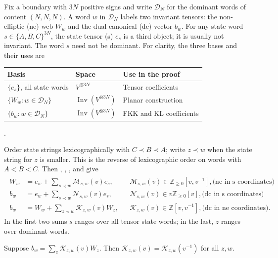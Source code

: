 \documentclass[a4paper,11pt]{amsart}
\newcommand{\Z}{\mathbb Z}
\newcommand{\Inv}{\operatorname{Inv}}
\newcommand{\tpar}{v}
\numberwithin{equation}{subsection}
\theoremstyle{plain}
\theoremstyle{definition}
\theoremstyle{remark}
\begin{document}
Fix a boundary with $3N$ positive signs and write $\mathcal D_N$ for
the dominant words of content $(N,N,N)$. A word $w$ in $\mathcal D_N$ labels
two invariant tensors: the non-elliptic (ne) web $W_w$ and the dual canonical (dc) vector $b_w$.
For any state word $s\in\{A,B,C\}^{3N}$, the state tensor (s) $e_s$
is a third object; it is usually not invariant. The word $s$ need not be dominant. 
For clarity, the three bases and their uses are
\begin{center}
\begin{tabular}{lll}
\toprule
Basis&Space&Use in the proof\\\midrule
$\{e_s\}$, all state words&$V^{\otimes3N}$&Tensor coefficients\\
$\{W_w:w\in\mathcal D_N\}$&$\Inv(V^{\otimes3N})$&Planar construction\\
$\{b_w:w\in\mathcal D_N\}$&$\Inv(V^{\otimes3N})$&FKK and KL coefficients\\\bottomrule
\end{tabular}
.
\end{center}
Order state strings lexicographically with $C\prec B\prec A$; write
$z\prec w$ when the state string for $z$ is smaller. This is the
reverse of lexicographic order on words with $A<B<C$. Then \cite[proof of Proposition $2.4'$]{FKK}, \cite[Corollary 4.5]{KashiwaraTanisaki},
\cite[Theorem 2]{KK}, 
and \cite[Corollary 3.7]{TubbenhauerCrystal} give
\begin{gather*}
\begin{aligned}
W_w&=e_w+\sum_{s\prec w}\mathcal M_{s,w}(\tpar)e_s,
&&\mathcal M_{s,w}(\tpar)\in\Z_{\geq 0}[\tpar,\tpar^{-1}],\text{(ne in s coordinates)}\\
b_w&=e_w+\sum_{s\prec w}\mathcal N_{s,w}(\tpar)e_s,
&&\mathcal N_{s,w}(\tpar)\in \tpar\Z_{\geq 0}[\tpar],\text{(dc in s coordinates)}\\
b_w&=W_w+\sum_{z\prec w}\mathcal K_{z,w}(\tpar)W_z,
&&\mathcal K_{z,w}(\tpar)\in\Z[\tpar,\tpar^{-1}],\text{(dc in ne coordinates)}.
\end{aligned}
\end{gather*}
In the first two sums $s$ ranges over all tensor state words;
in the last, $z$ ranges over dominant words.

\begin{lemma}\label{lem:bar-symmetric-coefficients}
Suppose
$b_w=\sum_z \mathcal K_{z,w}(\tpar)W_z$.
Then
$\mathcal K_{z,w}(\tpar)=\mathcal K_{z,w}(\tpar^{-1})$
for all $z,w$.
\end{lemma}
\end{document}
